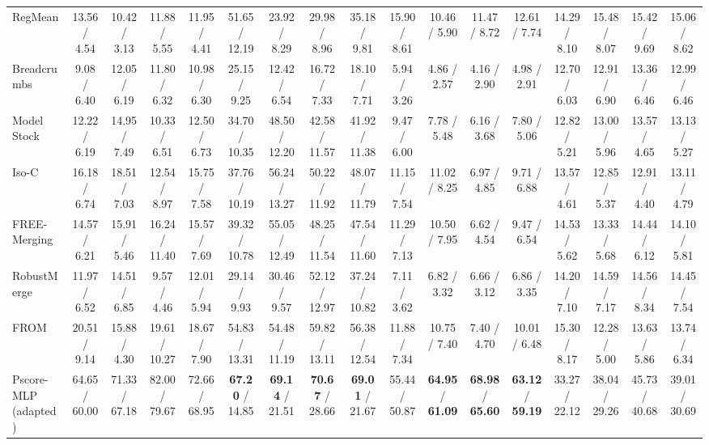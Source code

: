 \documentclass[journal,twoside,web]{ieeecolor}
\newcommand{\pub}[1]{{\color{gray}{\footnotesize{[{#1}]}}}}
\begin{document}
\begin{table}[!t]
{\begin{tabular}{l||ccc:c|ccc:c|ccc:c|ccc:c}
RegMean\pub{ICLR 2023} & 13.56 / 4.54 & 10.42 / 3.13 & 11.88 / 5.55 & 11.95 / 4.41 & 51.65 / 12.19 & 23.92 / 8.29 & 29.98 / 8.96 & 35.18 / 9.81 & 15.90 / 8.61 & 10.46 / 5.90 & 11.47 / 8.72 & 12.61 / 7.74 & 14.29 / 8.10 & 15.48 / 8.07 & 15.42 / 9.69 & 15.06 / 8.62 \\

Breadcrumbs\pub{ECCV 2024} & 9.08 / 6.40 & 12.05 / 6.19 & 11.80 / 6.32 & 10.98 / 6.30 & 25.15 / 9.25 & 12.42 / 6.54 & 16.72 / 7.33 & 18.10 / 7.71 & 5.94 / 3.26 & 4.86 / 2.57 & 4.16 / 2.90 & 4.98 / 2.91 & 12.70 / 6.03 & 12.91 / 6.90 & 13.36 / 6.46 & 12.99 / 6.46 \\


Model Stock\pub{ECCV 2024} & 12.22 / 6.19 & 14.95 / 7.49 & 10.33 / 6.51 & 12.50 / 6.73 & 34.70 / 10.35 & 48.50 / 12.20 & 42.58 / 11.57 & 41.92 / 11.38 & 9.47 / 6.00 & 7.78 / 5.48 & 6.16 / 3.68 & 7.80 / 5.06 & 12.82 / 5.21 & 13.00 / 5.96 & 13.57 / 4.65 & 13.13 / 5.27 \\

Iso-C\pub{ICML 2025} & 16.18 / 6.74 & 18.51 / 7.03 & 12.54 / 8.97 & 15.75 / 7.58 & 37.76 / 10.19 & 56.24 / 13.27 & 50.22 / 11.92 & 48.07 / 11.79 & 11.15 / 7.54 & 11.02 / 8.25 & 6.97 / 4.85 & 9.71 / 6.88 & 13.57 / 4.61 & 12.85 / 5.37 & 12.91 / 4.40 & 13.11 / 4.79 \\


FREE-Merging\pub{ICCV 2025} & 14.57 / 6.21 & 15.91 / 5.46 & 16.24 / 11.40 & 15.57 / 7.69 & 39.32 / 10.78 & 55.05 / 12.49 & 48.25 / 11.54 & 47.54 / 11.60 & 11.29 / 7.13 & 10.50 / 7.95 & 6.62 / 4.54 & 9.47 / 6.54 & 14.53 / 5.62 & 13.33 / 5.68 & 14.44 / 6.12 & 14.10 / 5.81 \\

RobustMerge\pub{NeurIPS 2025} & 11.97 / 6.52 & 14.51 / 6.85 & 9.57 / 4.46 & 12.01 / 5.94 & 29.14 / 9.93 & 30.46 / 9.57 & 52.12 / 12.97 & 37.24 / 10.82 & 7.11 / 3.62 & 6.82 / 3.32 & 6.66 / 3.12 & 6.86 / 3.35 & 14.20 / 7.10 & 14.59 / 7.17 & 14.56 / 8.34 & 14.45 / 7.54 \\


FROM\pub{AAAI 2026} & 20.51 / 9.14 & 15.88 / 4.30 & 19.61 / 10.27 & 18.67 / 7.90 & 54.83 / 13.31 & 54.48 / 11.19 & 59.82 / 13.11 & 56.38 / 12.54 & 11.88 / 7.34 & 10.75 / 7.40 & 7.40 / 4.70 & 10.01 / 6.48 & 15.30 / 8.17 & 12.28 / 5.00 & 13.63 / 5.86 & 13.74 / 6.34 \\

\hdashline
Pscore-MLP (adapted)\pub{TMI 2022} & 64.65 / 60.00 & 71.33 / 67.18 & 82.00 / 79.67 & 72.66 / 68.95 & \textbf{67.20} / 14.85 & \textbf{69.14} / 21.51 & \textbf{70.67} / 28.66 & \textbf{69.01} / 21.67 & 55.44 / 50.87 & \textbf{64.95} / \textbf{61.09} & \textbf{68.98} / \textbf{65.60} & \textbf{63.12} / \textbf{59.19} & 33.27 / 22.12 & 38.04 / 29.26 & 45.73 / 40.68 & 39.01 / 30.69 \\


\end{tabular}}
\end{table}
\end{document}
